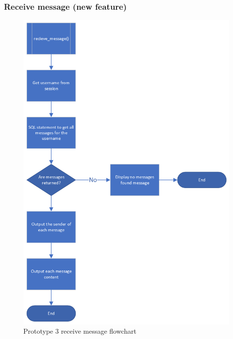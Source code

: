 \subsubsection{Receive message (new feature)}
\begin{figure}[H]
    \centering
    \includegraphics[scale=0.5]{ch3_developing/proto3/flow_recievemessage.png}
    \caption{Prototype 3 receive message flowchart}
    \label{fig:proto3_registerflow}
\end{figure}
